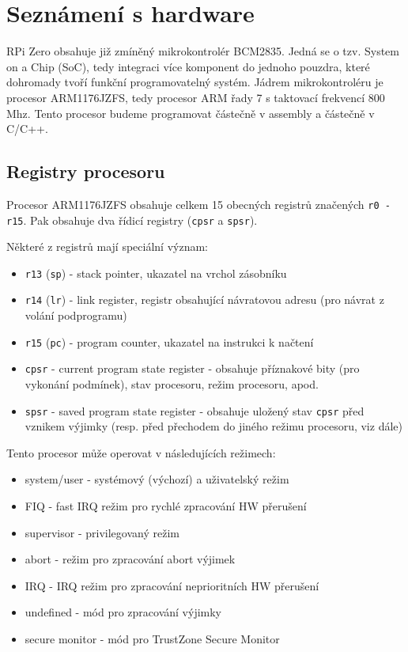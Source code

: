 \documentclass{article}
\begin{document}
\section{Seznámení s hardware}

RPi Zero obsahuje již zmíněný mikrokontrolér BCM2835. Jedná se o tzv. System on a Chip (SoC), tedy integraci více komponent do jednoho pouzdra, které dohromady tvoří funkční programovatelný systém. Jádrem mikrokontroléru je procesor ARM1176JZFS, tedy procesor ARM řady 7 s taktovací frekvencí 800 Mhz. Tento procesor budeme programovat částečně v assembly a částečně v C/C++.

\subsection{Registry procesoru}

Procesor ARM1176JZFS obsahuje celkem 15 obecných registrů značených \texttt{r0 - r15}. Pak obsahuje dva řídicí registry (\texttt{cpsr} a \texttt{spsr}).

Některé z registrů mají speciální význam:
\begin{itemize}
	\item \texttt{r13} (\texttt{sp}) - stack pointer, ukazatel na vrchol zásobníku
	\item \texttt{r14} (\texttt{lr}) - link register, registr obsahující návratovou adresu (pro návrat z volání podprogramu)
	\item \texttt{r15} (\texttt{pc}) - program counter, ukazatel na instrukci k načtení
	\item \texttt{cpsr} - current program state register - obsahuje příznakové bity (pro vykonání podmínek), stav procesoru, režim procesoru, apod.
	\item \texttt{spsr} - saved program state register - obsahuje uložený stav \texttt{cpsr} před vznikem výjimky (resp. před přechodem do jiného režimu procesoru, viz dále)
\end{itemize}

Tento procesor může operovat v následujících režimech:
\begin{itemize}
	\item system/user - systémový (výchozí) a uživatelský režim
	\item FIQ - fast IRQ režim pro rychlé zpracování HW přerušení
	\item supervisor - privilegovaný režim
	\item abort - režim pro zpracování abort výjimek
	\item IRQ - IRQ režim pro zpracování neprioritních HW přerušení
	\item undefined - mód pro zpracování výjimky 
	\item secure monitor - mód pro TrustZone Secure Monitor
\end{itemize}
\end{document}
